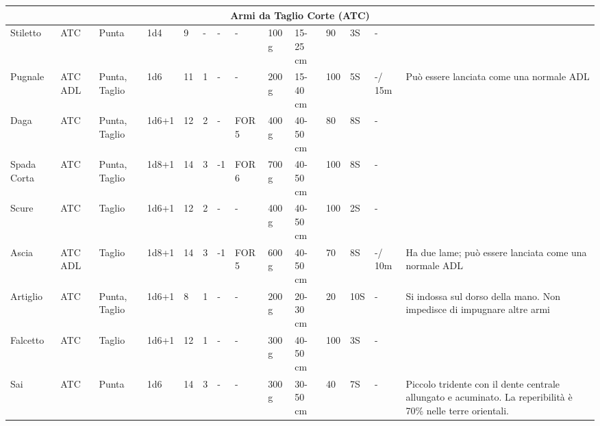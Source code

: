 {\begin{longtable}{|p{1.5cm}|p{0.7cm}|p{0.9cm}|p{0.9cm}|l|l|l|p{0.9cm}|p{0.8cm}|p{1.0cm}|l|l|p{0.75cm}|p{3.2cm}|}
  \hline\multicolumn{14}{|c|}{\normalsize\sc Armi da Taglio Corte (ATC)}\tabularnewline \hline\hline
  \raggedright Stiletto& \raggedright ATC& \raggedright Punta& \raggedright 1d4& \raggedright 9& \raggedright -& \raggedright -& \raggedright -& \raggedright 100 g& \raggedright 15-25 cm& \raggedright 90& \raggedright 3S& \raggedright -& \raggedright \tabularnewline \hline
  \raggedright Pugnale& \raggedright ATC ADL& \raggedright Punta, Taglio& \raggedright 1d6& \raggedright 11& \raggedright 1& \raggedright -& \raggedright -& \raggedright 200 g& \raggedright 15-40 cm& \raggedright 100& \raggedright 5S& \raggedright -/ 15m& \raggedright Pu\`o essere lanciata come una normale ADL\tabularnewline \hline
  \raggedright Daga& \raggedright ATC& \raggedright Punta, Taglio& \raggedright 1d6+1& \raggedright 12& \raggedright 2& \raggedright -& \raggedright FOR 5& \raggedright 400 g& \raggedright 40-50 cm& \raggedright 80& \raggedright 8S& \raggedright -& \raggedright \tabularnewline \hline
  \raggedright Spada Corta& \raggedright ATC& \raggedright Punta, Taglio& \raggedright 1d8+1& \raggedright 14& \raggedright 3& \raggedright -1& \raggedright FOR 6& \raggedright 700 g& \raggedright 40-50 cm& \raggedright 100& \raggedright 8S& \raggedright -& \raggedright \tabularnewline \hline
  \raggedright Scure& \raggedright ATC& \raggedright Taglio& \raggedright 1d6+1& \raggedright 12& \raggedright 2& \raggedright -& \raggedright -& \raggedright 400 g& \raggedright 40-50 cm& \raggedright 100& \raggedright 2S& \raggedright -& \raggedright \tabularnewline \hline
  \raggedright Ascia& \raggedright ATC ADL& \raggedright Taglio& \raggedright 1d8+1& \raggedright 14& \raggedright 3& \raggedright -1& \raggedright FOR 5& \raggedright 600 g& \raggedright 40-50 cm& \raggedright 70& \raggedright 8S& \raggedright -/ 10m& \raggedright Ha due lame; pu\`o essere lanciata come una normale ADL\tabularnewline \hline
  \raggedright Artiglio& \raggedright ATC& \raggedright Punta, Taglio& \raggedright 1d6+1& \raggedright 8& \raggedright 1& \raggedright -& \raggedright -& \raggedright 200 g& \raggedright 20-30 cm& \raggedright 20& \raggedright 10S& \raggedright -& \raggedright Si indossa sul dorso della mano. Non impedisce di impugnare altre armi\tabularnewline \hline
  \raggedright Falcetto& \raggedright ATC& \raggedright Taglio& \raggedright 1d6+1& \raggedright 12& \raggedright 1& \raggedright -& \raggedright -& \raggedright 300 g& \raggedright 40-50 cm& \raggedright 100& \raggedright 3S& \raggedright -& \raggedright \tabularnewline \hline
  \raggedright Sai& \raggedright ATC& \raggedright Punta& \raggedright 1d6& \raggedright 14& \raggedright 3& \raggedright -& \raggedright -& \raggedright 300 g& \raggedright 30-50 cm& \raggedright 40& \raggedright 7S& \raggedright -& \raggedright Piccolo tridente con il dente centrale allungato e acuminato. La reperibilit\`a \`e 70\% nelle terre orientali.\tabularnewline \hline

\end{longtable}}
